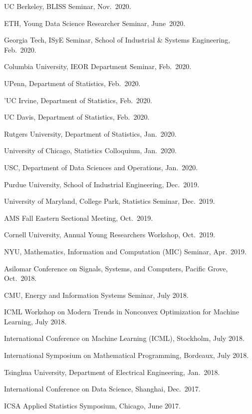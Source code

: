 \documentclass[a4paper, 10pt]{article}
\newenvironment{changemargin}[2]{%
  \begin{list}{}{%
    \setlength{\topsep}{0pt}%
    \setlength{\leftmargin}{#1}%
    \setlength{\rightmargin}{#2}%
    \setlength{\listparindent}{\parindent}%
    \setlength{\itemindent}{\parindent}%
    \setlength{\parsep}{\parskip}%
  }%
  \item[]}{\end{list}
}
\newenvironment{body} {
	\vspace*{-16pt}
	\begin{changemargin}{-0.3in}{-0.5in}
  }	
	{\end{changemargin}
}
\begin{document}
\begin{body}
\begin{enumerate}[label={[{T}{{\arabic*}}]}]
	\item UC Berkeley, BLISS Seminar, Nov.~2020.
	\item ETH, Young Data Science Researcher Seminar, June~2020.
	\item Georgia Tech, ISyE Seminar, School of Industrial \& Systems Engineering, Feb.~2020.
	\item Columbia University, IEOR Department Seminar, Feb.~2020.
	\item UPenn, Department of Statistics, Feb.~2020.
	\item 'UC Irvine, Department of Statistics, Feb.~2020.
	\item UC Davis, Department of Statistics, Feb.~2020.
	\item Rutgers University, Department of Statistics, Jan.~2020.
	\item University of Chicago, Statistics Colloquium, Jan.~2020.
	\item USC, Department of Data Sciences and Operations, Jan.~2020.
	\item Purdue University, School of Industrial Engineering, Dec.~2019.
	\item University of Maryland, College Park, Statistics Seminar, Dec.~2019.
	\item AMS Fall Eastern Sectional Meeting, Oct.~2019.
	\item Cornell University, Annual Young Researchers Workshop, Oct.~2019.
	\item NYU, Mathematics, Information and Computation (MIC) Seminar, Apr.~2019.
		\item Asilomar Conference on Signals, Systems, and Computers, Pacific Grove, Oct.~2018.
		\item CMU, Energy and Information Systems Seminar, July 2018.
		\item ICML Workshop on Modern Trends in Nonconvex Optimization for Machine Learning, July 2018.
		\item International Conference on Machine Learning (ICML), Stockholm, July 2018.
		\item International Symposium on Mathematical Programming, Bordeaux, July 2018.
		\item Tsinghua University, Department of Electrical Engineering, Jan.~2018.
			
		\item International Conference on Data Science, Shanghai, Dec.~2017.
		\item ICSA Applied Statistics Symposium, Chicago, June 2017.
		
		\end{enumerate}
\end{body}
\end{document}
